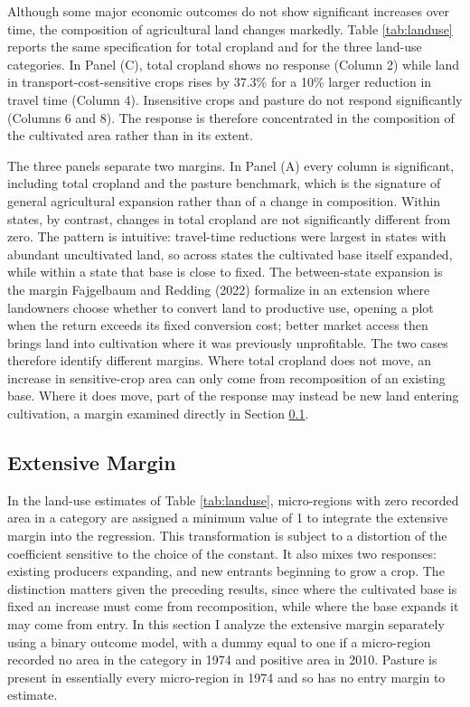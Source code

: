 \documentclass[11pt]{article}
\begin{document}
Although some major economic outcomes do not show significant increases over time, the composition of agricultural land changes markedly. Table \ref{tab:landuse} reports the same specification for total cropland and for the three land-use categories. In Panel (C), total cropland shows no response (Column 2) while land in transport-cost-sensitive crops rises by 37.3\% for a 10\% larger reduction in travel time (Column 4). Insensitive crops and pasture do not respond significantly (Columns 6 and 8). The response is therefore concentrated in the composition of the cultivated area rather than in its extent.

The three panels separate two margins. In Panel (A) every column is significant, including total cropland and the pasture benchmark, which is the signature of general agricultural expansion rather than of a change in composition. Within states, by contrast, changes in total cropland are not significantly different from zero. The pattern is intuitive: travel-time reductions were largest in states with abundant uncultivated land, so across states the cultivated base itself expanded, while within a state that base is close to fixed. The between-state expansion is the margin Fajgelbaum and Redding (2022) formalize in an extension where landowners choose whether to convert land to productive use, opening a plot when the return exceeds its fixed conversion cost; better market access then brings land into cultivation where it was previously unprofitable. The two cases therefore identify different margins. Where total cropland does not move, an increase in sensitive-crop area can only come from recomposition of an existing base. Where it does move, part of the response may instead be new land entering cultivation, a margin examined directly in Section \ref{sec:extensive}.

\subsection{Extensive Margin}
\label{sec:extensive}

In the land-use estimates of Table \ref{tab:landuse}, micro-regions with zero recorded area in a category are assigned a minimum value of 1 to integrate the extensive margin into the regression. This transformation is subject to a distortion of the coefficient sensitive to the choice of the constant. It also mixes two responses: existing producers expanding, and new entrants beginning to grow a crop. The distinction matters given the preceding results, since where the cultivated base is fixed an increase must come from recomposition, while where the base expands it may come from entry. In this section I analyze the extensive margin separately using a binary outcome model, with a dummy equal to one if a micro-region recorded no area in the category in 1974 and positive area in 2010. Pasture is present in essentially every micro-region in 1974 and so has no entry margin to estimate.
\end{document}
